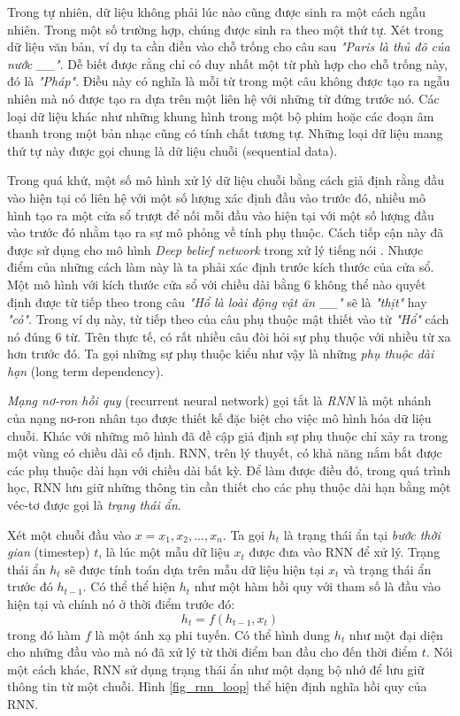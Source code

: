 Trong tự nhiên, dữ liệu không phải lúc nào cũng được sinh ra một cách ngẫu nhiên. Trong một số trường hợp, chúng được sinh ra theo một thứ tự. Xét trong dữ liệu văn bản, ví dụ ta cần điền vào chỗ trống cho câu sau \textit{"Paris là thủ đô của nước \_\_"}. Dễ biết được rằng chỉ có duy nhất một từ phù hợp cho chỗ trống này, đó là \textit{"Pháp"}. Điều này có nghĩa là mỗi từ trong một câu không được tạo ra ngẫu nhiên mà nó được tạo ra dựa trên một liên hệ với những từ đứng trước nó. Các loại dữ liệu khác như những khung hình trong một bộ phim hoặc các đoạn âm thanh trong một bản nhạc cũng có tính chất tương tự. Những loại dữ liệu mang thứ tự này được gọi chung là dữ liệu chuỗi (sequential data).

Trong quá khứ, một số mô hình xử lý dữ liệu chuỗi bằng cách giả định rằng đầu vào hiện tại có liên hệ với một số lượng xác định đầu vào trước đó, nhiều mô hình tạo ra một cửa sổ trượt để nối mỗi đầu vào hiện tại với một số lượng đầu vào trước đó nhằm tạo ra sự mô phỏng về tính phụ thuộc. Cách tiếp cận này đã được sử dụng cho mô hình \textit{Deep belief network} trong xử lý tiếng nói \cite{massetal2012}. Nhược điểm của những cách làm này là ta phải xác định trước kích thước của cửa sổ. Một mô hình với kích thước cửa sổ với chiều dài bằng 6 không thể nào quyết định được từ tiếp theo trong câu \textit{"Hổ là loài động vật ăn \_\_"} sẽ là \textit{"thịt"} hay \textit{"cỏ"}. Trong ví dụ này, từ tiếp theo của câu phụ thuộc mật thiết vào từ \textit{"Hổ"} cách nó đúng 6 từ. Trên thực tế, có rất nhiều câu đòi hỏi sự phụ thuộc với nhiều từ xa hơn trước đó. Ta gọi những sự phụ thuộc kiểu như vậy là những \textit{phụ thuộc dài hạn} (long term dependency). 

\textit{Mạng nơ-ron hồi quy} (recurrent neural network) \cite{elman1990} gọi tắt là \textit{RNN} là một nhánh của nạng nơ-ron nhân tạo được thiết kế đặc biệt cho việc mô hình hóa dữ liệu chuỗi. Khác với những mô hình đã đề cập giả định sự phụ thuộc chỉ xảy ra trong một vùng có chiều dài cố định. RNN, trên lý thuyết, có khả năng nắm bắt được các phụ thuộc dài hạn với chiều dài bất kỳ. Để làm được điều đó, trong quá trình học, RNN lưu giữ những thông tin cần thiết cho các phụ thuộc dài hạn bằng một véc-tơ được gọi là \textit{trạng thái ẩn}.

Xét một chuỗi đầu vào $x={x_1,x_2,...,x_n}$. Ta gọi $h_t$ là trạng thái ẩn tại \textit{bước thời gian} (timestep) $t$, là lúc một mẫu dữ liệu $x_t$ được đưa vào RNN để xử lý. Trạng thái ẩn $h_t$ sẽ được tính toán dựa trên mẫu dữ liệu hiện tại $x_t$ và trạng thái ẩn trước đó $h_{t-1}$. Có thể thể hiện $h_t$ như một hàm hồi quy với tham số là đầu vào hiện tại và chính nó ở thời điểm trước đó:
\begin{equation} \label{basicRnnEquation}
	h_t = f \left(h_{t-1}, x_t \right)
\end{equation}
trong đó hàm $f$ là một ánh xạ phi tuyến. Có thể hình dung $h_t$ như một đại diện cho những đầu vào mà nó đã xử lý từ thời điểm ban đầu cho đến thời điểm $t$. Nói một cách khác, RNN sử dụng trạng thái ẩn như một dạng bộ nhớ để lưu giữ thông tin từ một chuỗi. Hình \ref{fig_rnn_loop} thể hiện định nghĩa hồi quy của RNN.

